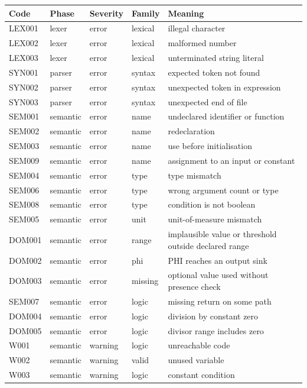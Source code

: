 \begin{longtable}{llllp{6.3cm}}
\toprule
\textbf{Code} & \textbf{Phase} & \textbf{Severity} & \textbf{Family} & \textbf{Meaning}\\
\midrule
\endhead
LEX001 & lexer & error & lexical & illegal character\\
LEX002 & lexer & error & lexical & malformed number\\
LEX003 & lexer & error & lexical & unterminated string literal\\
SYN001 & parser & error & syntax & expected token not found\\
SYN002 & parser & error & syntax & unexpected token in expression\\
SYN003 & parser & error & syntax & unexpected end of file\\
SEM001 & semantic & error & name & undeclared identifier or function\\
SEM002 & semantic & error & name & redeclaration\\
SEM003 & semantic & error & name & use before initialisation\\
SEM009 & semantic & error & name & assignment to an input or constant\\
SEM004 & semantic & error & type & type mismatch\\
SEM006 & semantic & error & type & wrong argument count or type\\
SEM008 & semantic & error & type & condition is not boolean\\
SEM005 & semantic & error & unit & unit-of-measure mismatch\\
DOM001 & semantic & error & range & implausible value or threshold outside declared range\\
DOM002 & semantic & error & phi & PHI reaches an output sink\\
DOM003 & semantic & error & missing & optional value used without presence check\\
SEM007 & semantic & error & logic & missing return on some path\\
DOM004 & semantic & error & logic & division by constant zero\\
DOM005 & semantic & error & logic & divisor range includes zero\\
W001 & semantic & warning & logic & unreachable code\\
W002 & semantic & warning & valid & unused variable\\
W003 & semantic & warning & logic & constant condition\\
\bottomrule
\end{longtable}

